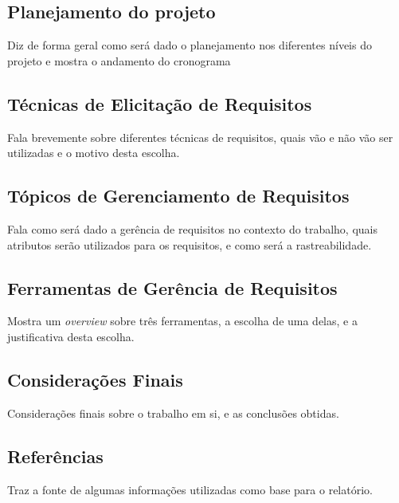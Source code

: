 \subsection{Planejamento do projeto}
Diz de forma geral como será dado o planejamento nos diferentes níveis do projeto e mostra o andamento do cronograma
\subsection{Técnicas de Elicitação de Requisitos}
Fala brevemente sobre diferentes técnicas de requisitos, quais vão e não vão ser utilizadas e o motivo desta escolha.
\subsection{Tópicos de Gerenciamento de Requisitos}
Fala como será dado a gerência de requisitos no contexto do trabalho, quais atributos serão utilizados para os requisitos, e como será a rastreabilidade.
\subsection{Ferramentas de Gerência de Requisitos}
Mostra um \emph{overview} sobre três ferramentas, a escolha de uma delas, e a justificativa desta escolha.
\subsection{Considerações Finais}
Considerações finais sobre o trabalho em si, e as conclusões obtidas.
\subsection{Referências}
Traz a fonte de algumas informações utilizadas como base para o relatório.
